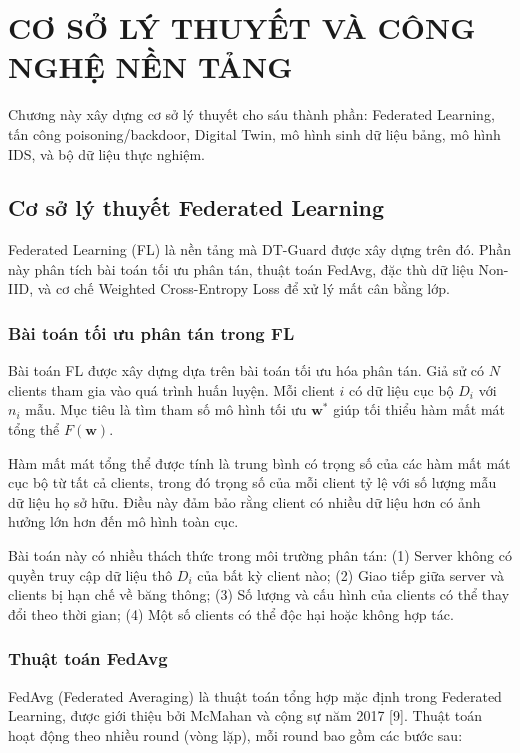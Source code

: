 \chapter{CƠ SỞ LÝ THUYẾT VÀ CÔNG NGHỆ NỀN TẢNG}
\label{Chapter3}

Chương này xây dựng cơ sở lý thuyết cho sáu thành phần: Federated Learning, tấn công poisoning/backdoor, Digital Twin, mô hình sinh dữ liệu bảng, mô hình IDS, và bộ dữ liệu thực nghiệm.

\section{Cơ sở lý thuyết Federated Learning}
Federated Learning (FL) là nền tảng mà DT-Guard được xây dựng trên đó. Phần này phân tích bài toán tối ưu phân tán, thuật toán FedAvg, đặc thù dữ liệu Non-IID, và cơ chế Weighted Cross-Entropy Loss để xử lý mất cân bằng lớp.

\subsection{Bài toán tối ưu phân tán trong FL}
Bài toán FL được xây dựng dựa trên bài toán tối ưu hóa phân tán. Giả sử có $N$ clients tham gia vào quá trình huấn luyện. Mỗi client $i$ có dữ liệu cục bộ $D_{i}$ với $n_{i}$ mẫu. Mục tiêu là tìm tham số mô hình tối ưu $\mathbf{w}^{*}$ giúp tối thiểu hàm mất mát tổng thể $F(\mathbf{w})$.

Hàm mất mát tổng thể được tính là trung bình có trọng số của các hàm mất mát cục bộ từ tất cả clients, trong đó trọng số của mỗi client tỷ lệ với số lượng mẫu dữ liệu họ sở hữu. Điều này đảm bảo rằng client có nhiều dữ liệu hơn có ảnh hưởng lớn hơn đến mô hình toàn cục.

Bài toán này có nhiều thách thức trong môi trường phân tán: (1) Server không có quyền truy cập dữ liệu thô $D_{i}$ của bất kỳ client nào; (2) Giao tiếp giữa server và clients bị hạn chế về băng thông; (3) Số lượng và cấu hình của clients có thể thay đổi theo thời gian; (4) Một số clients có thể độc hại hoặc không hợp tác.

\subsection{Thuật toán FedAvg}
FedAvg (Federated Averaging) là thuật toán tổng hợp mặc định trong Federated Learning, được giới thiệu bởi McMahan và cộng sự năm 2017 {[}9{]}. Thuật toán hoạt động theo nhiều round (vòng lặp), mỗi round bao gồm các bước sau:

